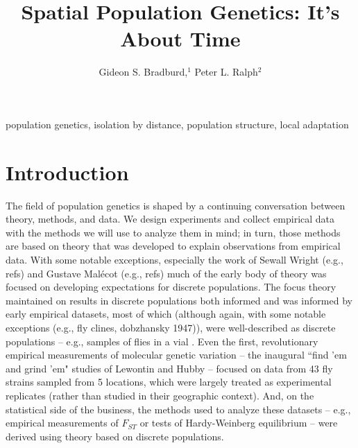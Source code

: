 \documentclass{ar-1col}
\newcommand{\g}[1]{{\color{blue}{#1}}}
\newcommand{\todo}[1]{{\textbf{\color{red}{#1}}}}
\begin{document}

\title{Spatial Population Genetics: It's About Time}


\author{Gideon S. Bradburd,$^1$ Peter L. Ralph$^2$
}

\begin{abstract}
\todo{Abstract text, approximately 150 words.}
\end{abstract}

\begin{keywords}
population genetics, isolation by distance, population structure, local adaptation
\end{keywords}
\maketitle

\tableofcontents


\section{Introduction}
\todo{read through and edit}

The field of population genetics is shaped by a continuing conversation
between theory, methods, and data.
We design experiments and collect empirical data
with the methods we will use to analyze them in mind;
in turn, those methods are based on theory
that was developed to explain observations from empirical data.
With some notable exceptions,
especially the work of Sewall Wright (e.g., refs)
and Gustave Mal\'ecot (e.g., refs)
\g{, and later Monty Slatkin (e.g., refs),}
much of the early body of theory was focused on
developing expectations for discrete populations.
The focus theory maintained on results in discrete populations
both informed and was informed by early empirical datasets,
most of which
(although again,
with some notable exceptions (e.g., fly clines, dobzhansky 1947)),
were well-described as discrete populations --
e.g., samples of flies in a vial \cite{Lewontin1974}.
Even the first, revolutionary empirical measurements
of molecular genetic variation
-- the inaugural ``find 'em and grind 'em" studies of Lewontin and Hubby \cite{LewontinHubby66,HubbyLewontin66} --
focused on data from 43 fly strains sampled from 5 locations,
which were largely treated as experimental replicates
(rather than studied in their geographic context).
And, on the statistical side of the business,
the methods used to analyze these datasets --
e.g., empirical measurements of $F_{ST}$ \cite{wright}
or tests of Hardy-Weinberg equilibrium \cite{hardy,weinberg,stern1943,crow1988} --
were derived using theory based on discrete populations.
\end{document}
